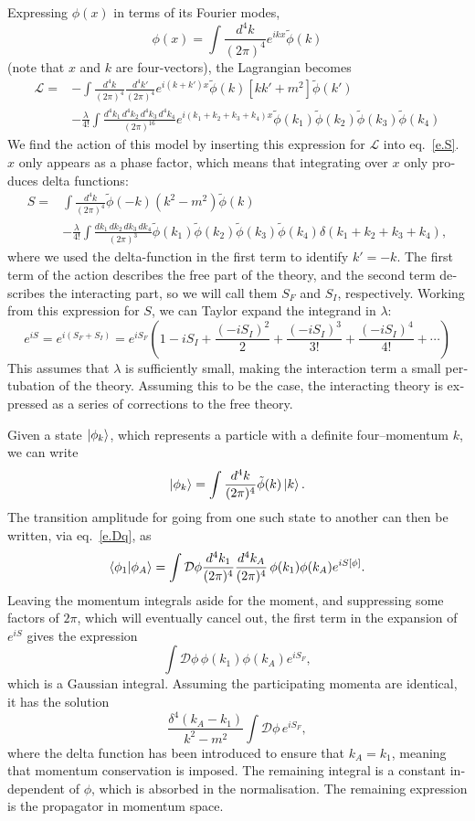 \begin{english}
Expressing $\phi(x)$ in terms of its Fourier modes,
\[\phi(x)=\int\frac{d^4k}{(2\pi)^4}e^{ikx}\tilde\phi(k)\]
(note that $x$ and $k$ are four-vectors), the Lagrangian becomes
\begin{align*}\mathcal L=&-\int\frac{d^4k}{(2\pi)^4}\frac{d^4k\prime}{(2\pi)^4} e^{i(k+k\prime)x}\tilde\phi(k)[kk\prime +m^2]\tilde\phi(k\prime)\\
&-\frac{\lambda}{4!}\int\frac{d^4k_1\,d^4k_2\,d^4k_3\,d^4k_4}{(2\pi)^{16}}e^{i(k_1+k_2+k_3+k_4)x}\tilde\phi(k_1)\tilde\phi(k_2)\tilde\phi(k_3)\tilde\phi(k_4)
\end{align*}
We find the action of this model by inserting this expression for $\mathcal L$ into eq.~\eqref{e.S}. $x$ only appears as a phase factor, which means that integrating over $x$ only produces delta functions:
\begin{align*}
S=&\int\frac{d^4k}{(2\pi)^4}\tilde\phi(-k)(k^2-m^2)\tilde\phi(k)\\
&-\frac{\lambda}{4!}\int\frac{dk_1\,dk_2\,dk_3\,dk_4}{(2\pi)^3}\tilde\phi(k_1)\tilde\phi(k_2)\tilde\phi(k_3)\tilde\phi(k_4)\delta(k_1+k_2+k_3+k_4),
\end{align*}
where we used the delta-function in the first term to identify $k\prime=-k$. The first term of the action describes the free part of the theory, and the second term describes the interacting part, so we will call them $S_F$ and $S_I$, respectively. Working from this expression for $S$, we can Taylor expand the integrand in $\lambda$:
\[e^{iS}=e^{i(S_F+S_I)}=e^{iS_F}\left(1-iS_I+\frac{(-iS_I)^2}{2}+\frac{(-iS_I)^3}{3!}+\frac{(-iS_I)^4}{4!}+\cdots\right)\]
This assumes that $\lambda$ is sufficiently small, making the interaction term a small pertubation of the theory. Assuming this to be the case, the interacting theory is expressed as a series of corrections to the free theory.

Given a state $\left| \phi_k \right\rangle$, which represents a particle with a definite four--momentum $k$, we can write
\[\left| \phi_k \right\rangle=\int\frac{d^4k}{(2\pi)^4}\tilde\phi(k)\left| k \right\rangle.\]
The transition amplitude for going from one such state to another can then be written, via eq.~\eqref{e.Dq}, as
\[\left\langle\phi_1\middle|\phi_A\right\rangle=\int\mathcal D\phi\frac{d^4k_1}{(2\pi)^4}\frac{d^4k_A}{(2\pi)^4}\,\phi(k_1)\phi(k_A)e^{iS[\phi]}.\]
Leaving the momentum integrals aside for the moment, and suppressing some factors of $2\pi$, which will eventually cancel out, the first term in the expansion of $e^{iS}$ gives the expression
\[\int\mathcal D\phi\,\phi(k_1)\phi(k_A)e^{iS_F},\]
which is a Gaussian integral. Assuming the participating momenta are identical, it has the solution \cite{griffiths:gauss}
\[\frac{\delta^4(k_A-k_1)}{k^2-m^2}\int\mathcal D\phi\,e^{iS_F},\] 
where the delta function has been introduced to ensure that $k_A=k_1$, meaning that momentum conservation is imposed. The remaining integral is a constant independent of $\phi$, which is absorbed in the normalisation. The remaining expression is the propagator in momentum space. 
 

\end{english}
